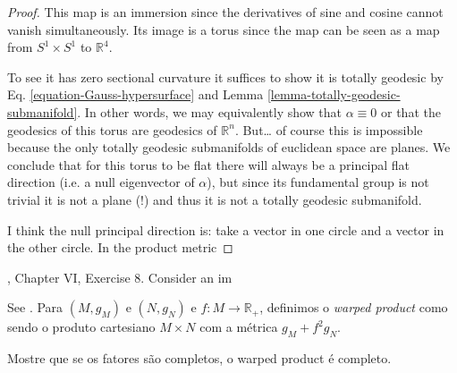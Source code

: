 \begin{proof}
This map is an immersion since the derivatives of sine and cosine cannot vanish
simultaneously. Its image is a torus since the map can be seen as a map
from $S^1\times S^1$ to $\mathbb{R}^4$.

To see it has zero sectional curvature
it suffices to show it is totally geodesic by Eq.
\ref{equation-Gauss-hypersurface} and Lemma
\ref{lemma-totally-geodesic-submanifold}. In other words, we may equivalently
show that $\alpha\equiv0$ or that the geodesics of this torus are geodesics of
$\mathbb{R}^n$. But… of course this is impossible because the only totally
geodesic submanifolds of euclidean space are planes. We conclude that for this
torus to be flat there will always be a principal flat direction (i.e. a null
eigenvector of $\alpha$), but since its
fundamental group is not trivial it is not a plane (!) and thus it is not a
totally geodesic submanifold.

I think the null principal direction is: take a vector in one circle and a
vector in the other circle. In the product metric

\end{proof}

\begin{exercise}
\label{exercise-Clifford-torus}
\cite{doc}, Chapter VI, Exercise 8. Consider an im
\end{exercise}

\begin{exercise}
\label{exercise-wraped-product}
See \cite{pet}. Para $(M,g_M)$ e $(N,g_N)$ e $f:M \to \mathbb{R}_+$, definimos o
 {\it warped product} como sendo o produto cartesiano $M\times N$ com a métrica 
 $g_M+f^2g_N$.

Mostre que se os fatores são completos, o warped product é completo.
\end{exercise}

